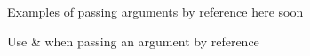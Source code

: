 \documentclass[12pt,a4paper,final]{report} %
\begin{document}
Examples of passing arguments by reference here soon

Use \& when passing an argument by reference

\printbibliography[heading=bibintoc]
\end{document}
